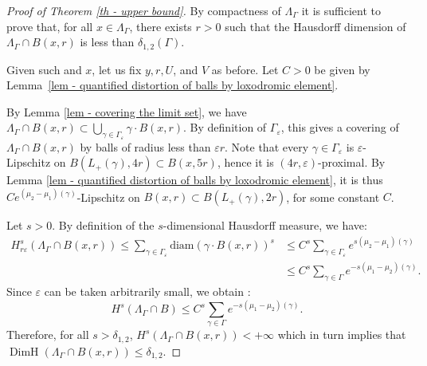 \documentclass[JEP,XML,SOM,Unicode,NoEqCountersInSection,NoFloatCountersInSection,published]{cedram}
\theoremstyle{definition}
\DeclareMathOperator{\DimH}{DimH}
\let\epsilon\varepsilon
\let\G\Gamma
\let\g\gamma
\begin{document}
\begin{proof}[Proof of Theorem \ref{th - upper bound}]
By compactness of $\Lambda_\Gamma$ it is sufficient to prove that, for all $x\in \Lambda_\Gamma$, there exists $r>0$ such that the Hausdorff dimension of $\Lambda_\Gamma \cap B(x,r)$ is less than $ \delta_{1,2}(\G)$.

Given such and $x$, let us fix $y, r, U$, and $V$ as before. Let $C>0$ be given by Lemma~\ref{lem - quantified distortion of balls by loxodromic element}.

By Lemma \ref{lem - covering the limit set}, we have $\Lambda_\Gamma\cap B(x,r) \subset \bigcup_{\g \in \G_\epsilon} \g \cdot B(x,r)$. By definition of $\G_\epsilon$, this gives a covering of $\Lambda_\Gamma\cap B(x,r)$ by balls of radius less than $\epsilon r$.
Note that every $\gamma \in \Gamma_\epsilon$ is $\epsilon$-Lipschitz on $B(L_+(\gamma), 4r) \subset B(x,5r)$, hence it is $(4r,\epsilon)$\nobreakdash-prox\-imal. By Lemma \ref{lem - quantified distortion of balls by loxodromic element}, it is thus $Ce^{(\mu_2-\mu_1)(\gamma)}$-Lipschitz on $B(x,r) \subset B(L_+(\g),2r)$, for some constant $C$.

Let $s>0$. By definition of the $s$-dimensional Hausdorff measure, we have:
\begin{align*}
H^{s}_{r\epsilon} (\Lambda_\Gamma \cap B(x,r))\leq \sum_{\g\in \G_\epsilon} \mathrm{diam}(\g \cdot B(x,r)) ^s
& \leq C^s \sum_{\g\in \G_\epsilon} e^{s(\mu_2- \mu_1)(\g)}\\
&\leq C^s \sum_{\g\in \G} e^{-s(\mu_1- \mu_2) (\g)}.
\end{align*}
Since $\epsilon$ can be taken arbitrarily small, we obtain :
\[H^{s} (\Lambda_\G \cap B)\leq C^s \sum_{\g\in \G} e^{-s(\mu_1- \mu_2) (\g)}.\]
Therefore, for all $s>\delta_{1,2}$,
$H^{s} (\Lambda_\G \cap B(x,r))<+\infty$ which in turn implies that $\DimH(\Lambda_\G\cap B(x,r)) \leq \delta_{1,2}$.
\end{proof}

\backmatter


\end{document}
